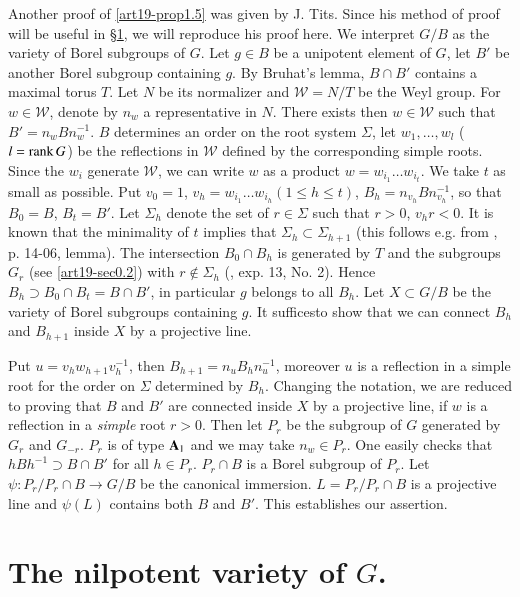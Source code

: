 Another proof of \ref{art19-prop1.5} was given by J. Tits. Since his method of proof will be useful in \S\ref{art19-sec2}, we will reproduce his proof here. We interpret $G/B$ as the variety of Borel subgroups of $G$. Let $g\in B$ be a unipotent element of $G$, let $B'$ be another Borel subgroup containing $g$. By Bruhat's lemma, $B\cap B'$ contains a maximal torus $T$. Let $N$ be its normalizer and $\mathscr{W}=N/T$ be the Weyl group. For $w\in \mathscr{W}$, denote by $n_{w}$ a representative in $N$. There exists then $w\in \mathscr{W}$ such that $B'=n_{w}Bn^{-1}_{w}$. $B$ determines an order on the root system $\Sigma$, let $w_{1},\ldots,w_{l}$ ($l=\operatorname{\mathrm{rank}} G$) be the reflections in $\mathscr{W}$ defined by the corresponding simple roots. Since the $w_{i}$ generate $\mathscr{W}$, we can write $w$ as a product $w=w_{i_{1}}\ldots w_{i_{t}}$. We take $t$ as small as possible. Put $v_{0}=1$, $v_{h}=w_{i_{1}}\ldots w_{i_{h}}(1\leq h\leq t)$, $B_{h}=n_{v_{h}}Bn^{-1}_{v_{h}}$, so that $B_{0}=B$, $B_{t}=B'$. Let $\Sigma_{h}$ denote the set of $r\in \Sigma$ such that $r>0$, $v_{h}r<0$. It is known that the minimality of $t$ implies that $\Sigma_{h}\subset \Sigma_{h+1}$ (this follows e.g. from \cite{art19-key5}, p. 14-06, lemma). The intersection $B_{0}\cap B_{h}$ is generated by $T$ and the subgroups $G_{r}$ (see \ref{art19-sec0.2}) with $r\not\in \Sigma_{h}$ (\cite{art19-key5}, exp. 13, No. 2). Hence $B_{h}\supset B_{0}\cap B_{t}=B\cap B'$, in particular $g$ belongs to all $B_{h}$. Let $X\subset G/B$ be the variety of Borel subgroups containing $g$. It suffices\pageoriginale to show that we can connect $B_{h}$ and $B_{h+1}$ inside $X$ by a projective line.

Put $u=v_{h}w_{h+1}v^{-1}_{h}$, then $B_{h+1}=n_{u}B_{h}n^{-1}_{u}$, moreover $u$ is a reflection in a simple root for the order on $\Sigma$ determined by $B_{h}$. Changing the notation, we are reduced to proving that $B$ and $B'$ are connected inside $X$ by a projective line, if $w$ is a reflection in a {\em simple} root $r>0$. Then let $P_{r}$ be the subgroup of $G$ generated by $G_{r}$ and $G_{-r}$. $P_{r}$ is of type $\mathbf{A}_{1}$ and we may take $n_{w}\in P_{r}$. One easily checks that $hBh^{-1}\supset B\cap B'$ for all $h\in P_{r}$. $P_{r}\cap B$ is a Borel subgroup of $P_{r}$. Let $\psi:P_{r}/P_{r}\cap B\to G/B$ be the canonical immersion. $L=P_{r}/P_{r}\cap B$ is a projective line and $\psi(L)$ contains both $B$ and $B'$. This establishes our assertion.

\section{The nilpotent variety of \texorpdfstring{$G$}{G}.}\label{art19-sec2}

